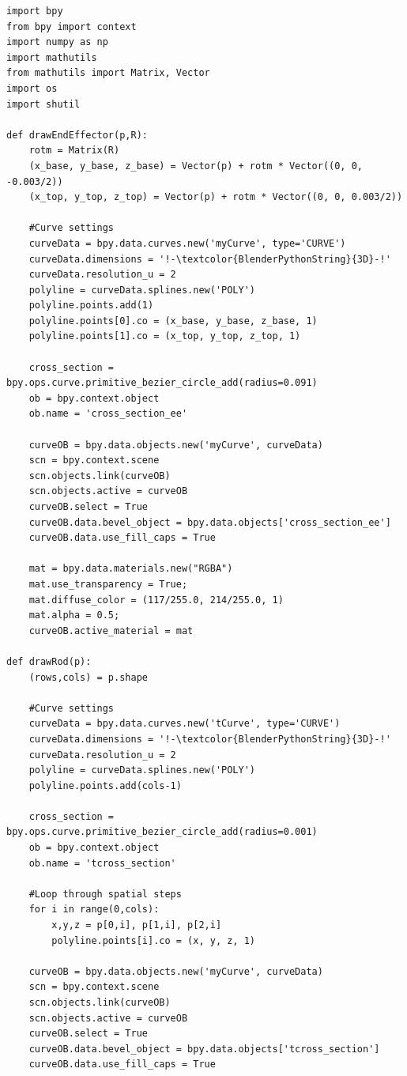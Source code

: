 \documentclass[12pt]{article}
\begin{document}
\begin{lstlisting}
import bpy
from bpy import context
import numpy as np
import mathutils
from mathutils import Matrix, Vector
import os
import shutil

def drawEndEffector(p,R):
    rotm = Matrix(R)
    (x_base, y_base, z_base) = Vector(p) + rotm * Vector((0, 0, -0.003/2))
    (x_top, y_top, z_top) = Vector(p) + rotm * Vector((0, 0, 0.003/2))
    	
    #Curve settings
    curveData = bpy.data.curves.new('myCurve', type='CURVE')
    curveData.dimensions = '!-\textcolor{BlenderPythonString}{3D}-!'
    curveData.resolution_u = 2
    polyline = curveData.splines.new('POLY')
    polyline.points.add(1)
    polyline.points[0].co = (x_base, y_base, z_base, 1)
    polyline.points[1].co = (x_top, y_top, z_top, 1)

    cross_section = bpy.ops.curve.primitive_bezier_circle_add(radius=0.091)
    ob = bpy.context.object
    ob.name = 'cross_section_ee'

    curveOB = bpy.data.objects.new('myCurve', curveData)
    scn = bpy.context.scene
    scn.objects.link(curveOB)
    scn.objects.active = curveOB
    curveOB.select = True
    curveOB.data.bevel_object = bpy.data.objects['cross_section_ee']
    curveOB.data.use_fill_caps = True
    
    mat = bpy.data.materials.new("RGBA")
    mat.use_transparency = True;
    mat.diffuse_color = (117/255.0, 214/255.0, 1)
    mat.alpha = 0.5;
    curveOB.active_material = mat

def drawRod(p):
    (rows,cols) = p.shape

    #Curve settings
    curveData = bpy.data.curves.new('tCurve', type='CURVE')
    curveData.dimensions = '!-\textcolor{BlenderPythonString}{3D}-!'
    curveData.resolution_u = 2
    polyline = curveData.splines.new('POLY')
    polyline.points.add(cols-1)
        
    cross_section = bpy.ops.curve.primitive_bezier_circle_add(radius=0.001)
    ob = bpy.context.object
    ob.name = 'tcross_section'

    #Loop through spatial steps
    for i in range(0,cols):
    	x,y,z = p[0,i], p[1,i], p[2,i]
    	polyline.points[i].co = (x, y, z, 1)
            
    curveOB = bpy.data.objects.new('myCurve', curveData)
    scn = bpy.context.scene
    scn.objects.link(curveOB)
    scn.objects.active = curveOB
    curveOB.select = True
    curveOB.data.bevel_object = bpy.data.objects['tcross_section']
    curveOB.data.use_fill_caps = True
    

\end{lstlisting}
\end{document}

